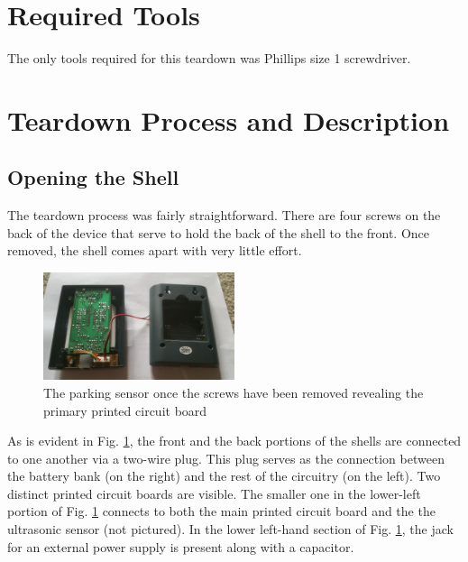\documentclass[journal]{IEEEtran}
\begin{document}
\section{Required Tools}
The only tools required for this teardown was Phillips size 1 screwdriver.

\section{Teardown Process and Description}
\subsection{Opening the Shell}
The teardown process was fairly straightforward. There are four screws on the back of the device that serve to 
hold the back of the shell to the front. Once removed, the shell comes apart with very little effort. 

\begin{figure}[h]
  \includegraphics[width=0.5\textwidth]{img/img4.jpg}
  \caption{The parking sensor once the screws have been removed revealing the primary printed circuit board}
  \label{fig:img4}
\end{figure}

As is evident in Fig. \ref{fig:img4}, the front and the back portions of the shells are connected to one another via a
two-wire plug. This plug serves as the connection between the battery bank (on the right) and the rest of the circuitry 
(on the left). Two distinct printed circuit boards are visible. The smaller one in the lower-left portion of Fig. \ref{fig:img4}
connects to both the main printed circuit board and the the ultrasonic sensor (not pictured). In the lower left-hand section
of Fig. \ref{fig:img4}, the jack for an external power supply is present along with a capacitor. 
\end{document}
